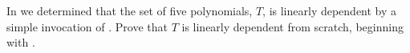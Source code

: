 In  we determined that the set of five polynomials, $T$, is linearly dependent by a simple invocation of .  Prove that $T$ is linearly dependent from scratch, beginning with .